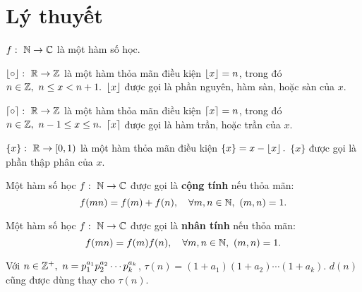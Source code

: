 \documentclass[../../imo-training-open-book.tex]{subfiles}
\begin{document}
\section{Lý thuyết}

\begin{definition*}
    \label{definition:arithmetic-function}
    $f:\ \mathbb N \to \mathbb C$ là một hàm số học.
\end{definition*}

\begin{definition*}
    \label{definition:floor}
    $\left\lfloor \circ \right\rfloor:\ \mathbb R \rightarrow \mathbb Z$ là một hàm thỏa mãn điều kiện $\left\lfloor x \right\rfloor = n$, trong đó $n \in \mathbb Z,\ n \leq x < n+1.$
    $\left\lfloor x \right\rfloor$ được gọi là phần nguyên, hàm sàn, hoặc sàn của $x$. 
\end{definition*}

\begin{definition*}
    \label{definition:ceiling}
    $\left\lceil \circ \right\rceil:\ \mathbb R \rightarrow \mathbb Z$ là một hàm thỏa mãn điều kiện $\left\lceil x \right\rceil = n$, trong đó $n \in \mathbb Z,\ n-1 \leq x \leq n.$
    $\left\lceil x \right\rceil$ được gọi là hàm trần, hoặc trần của $x$.
\end{definition*}

\begin{definition*}
    \label{definition:fractional}
    $\{ x \}:\ \mathbb R \rightarrow [0,1)$ là một hàm thỏa mãn điều kiện $\{x\} = x - \left\lfloor x \right\rfloor.$
    $\{x\}$ được gọi là phần thập phân của $x$.
\end{definition*}

\begin{definition*}
    \label{definition:additive-function}
    Một hàm số học \( f:\ \mathbb N \to \mathbb C \) được gọi là \textbf{cộng tính} nếu thỏa mãn:
    \[
        f(mn) = f(m) + f(n),\quad \forall m,n \in \mathbb N,\ (m,n)=1.
    \]
\end{definition*}

\begin{definition*}
    \label{definition:multiplicative-function}
    Một hàm số học \( f:\ \mathbb N \to \mathbb C \) được gọi là \textbf{nhân tính} nếu thỏa mãn:
    \[
        f(mn) = f(m)f(n),\quad \forall m,n \in \mathbb N,\ (m,n)=1.
    \]
\end{definition*}

\begin{definition*}
    \label{definition:tau-function}
    Với $n \in \mathbb Z^{+},\ n=p_1^{a_1}p_2^{a_2} \cdots p_k^{a_k}$, $\tau(n) = (1+a_1)(1+a_2) \cdots (1+a_k).$
    $d(n)$ cũng được dùng thay cho $\tau(n).$
\end{definition*}
\end{document}
